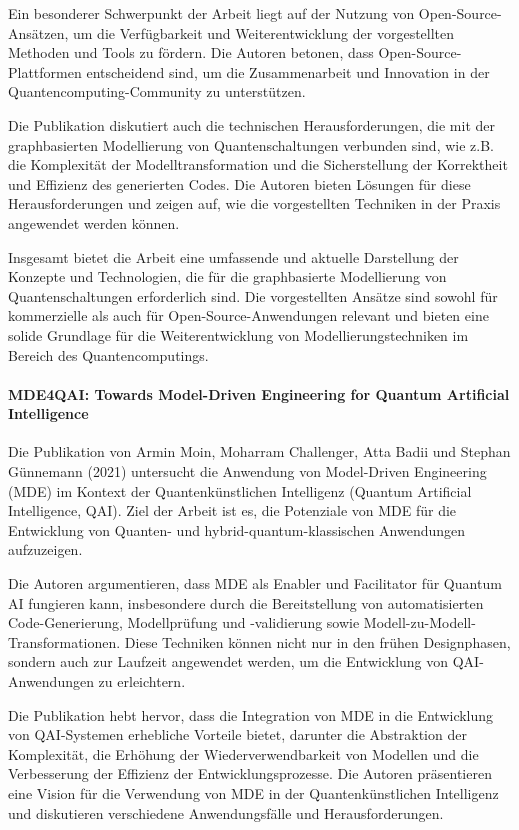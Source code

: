 Ein besonderer Schwerpunkt der Arbeit liegt auf der Nutzung von Open-Source-Ansätzen, um die Verfügbarkeit und 
Weiterentwicklung der vorgestellten Methoden und Tools zu fördern. Die Autoren betonen, dass Open-Source-Plattformen 
entscheidend sind, um die Zusammenarbeit und Innovation in der Quantencomputing-Community zu unterstützen.

Die Publikation diskutiert auch die technischen Herausforderungen, die mit der graphbasierten Modellierung von 
Quantenschaltungen verbunden sind, wie z.B. die Komplexität der Modelltransformation und die Sicherstellung der 
Korrektheit und Effizienz des generierten Codes. Die Autoren bieten Lösungen für diese Herausforderungen und zeigen 
auf, wie die vorgestellten Techniken in der Praxis angewendet werden können.

Insgesamt bietet die Arbeit eine umfassende und aktuelle Darstellung der Konzepte und Technologien, die für die 
graphbasierte Modellierung von Quantenschaltungen erforderlich sind. Die vorgestellten Ansätze sind sowohl für 
kommerzielle als auch für Open-Source-Anwendungen relevant und bieten eine solide Grundlage für die Weiterentwicklung 
von Modellierungstechniken im Bereich des Quantencomputings.

\paragraph{MDE4QAI: Towards Model-Driven Engineering for Quantum Artificial Intelligence}

Die Publikation von Armin Moin, Moharram Challenger, Atta Badii und Stephan Günnemann (2021) \cite{moin2021mde4qai} untersucht die Anwendung 
von Model-Driven Engineering (MDE) im Kontext der Quantenkünstlichen Intelligenz (Quantum Artificial Intelligence, QAI). 
Ziel der Arbeit ist es, die Potenziale von MDE für die Entwicklung von Quanten- und hybrid-quantum-klassischen Anwendungen aufzuzeigen.

Die Autoren argumentieren, dass MDE als Enabler und Facilitator für Quantum AI fungieren kann, insbesondere durch 
die Bereitstellung von automatisierten Code-Generierung, Modellprüfung und -validierung sowie Modell-zu-Modell-Transformationen. 
Diese Techniken können nicht nur in den frühen Designphasen, sondern auch zur Laufzeit angewendet werden, um die Entwicklung von QAI-Anwendungen zu erleichtern.

Die Publikation hebt hervor, dass die Integration von MDE in die Entwicklung von QAI-Systemen erhebliche Vorteile 
bietet, darunter die Abstraktion der Komplexität, die Erhöhung der Wiederverwendbarkeit von Modellen und die 
Verbesserung der Effizienz der Entwicklungsprozesse. Die Autoren präsentieren eine Vision für die Verwendung von 
MDE in der Quantenkünstlichen Intelligenz und diskutieren verschiedene Anwendungsfälle und Herausforderungen.

